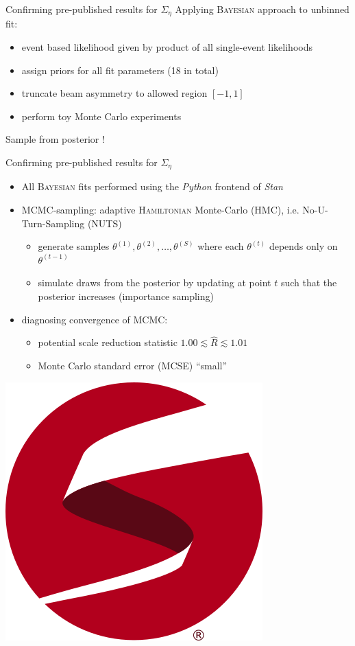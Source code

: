 \documentclass[11pt,aspectratio=169,dvipsnames]{beamer}
\begin{document}
		\begin{frame}{Confirming pre-published results for $\Sigma_\eta$}
		Applying \textsc{Bayesian} approach to unbinned fit:
		\begin{itemize}
			\item event based likelihood given by product of all single-event likelihoods 
			\item assign priors for all fit parameters (18 in total)
			\item truncate beam asymmetry to allowed region $[-1,1]$
			\item perform toy Monte Carlo experiments
		\end{itemize}
		Sample from posterior !
	\end{frame}
	
	\begin{frame}{Confirming pre-published results for $\Sigma_\eta$}
		\begin{itemize}
			\item All \textsc{Bayesian} fits performed using the \emph{Python} frontend of \emph{Stan}
			\item MCMC-sampling: adaptive \textsc{Hamiltonian} Monte-Carlo (HMC), i.e. No-U-Turn-Sampling (NUTS)
			\begin{itemize}
				\item generate samples $\theta^{(1)},\theta^{(2)},\dots,\theta^{(S)}$ where each $\theta^{(t)}$ depends only on $\theta^{(t-1)}$
				\item simulate draws from the posterior by updating at point $t$ such that the posterior increases (importance sampling)
			\end{itemize}
		\item diagnosing convergence of MCMC:
		\begin{itemize}
			\item potential scale reduction statistic $1.00\lesssim\widehat{R}\lesssim1.01$
			\item Monte Carlo standard error (MCSE) \enquote{small}
		\end{itemize}
		\end{itemize}

	\begin{flushright}
		\includegraphics[width=.1\linewidth]{figs/logo-tm.png}\\
		\cites{stan,nuts}
	\end{flushright}
	\end{frame}
\end{document}
